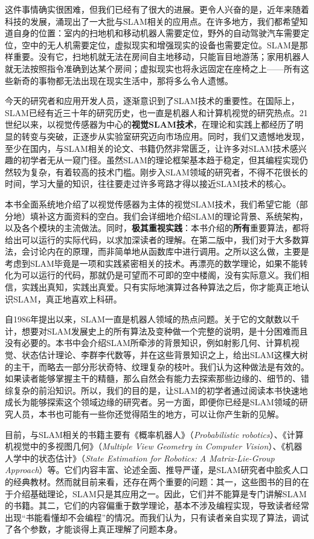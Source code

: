 这件事情确实很困难，但我们已经有了很大的进展。更令人兴奋的是，近年来随着科技的发展，涌现出了一大批与SLAM相关的应用点。在许多地方，我们都希望知道自身的位置：室内的扫地机和移动机器人需要定位，野外的自动驾驶汽车需要定位，空中的无人机需要定位，虚拟现实和增强现实的设备也需要定位。SLAM是那样重要。没有它，扫地机就无法在房间自主地移动，只能盲目地游荡；家用机器人就无法按照指令准确到达某个房间；虚拟现实也将永远固定在座椅之上——所有这些新奇的事物都无法出现在现实生活中，那将多么令人遗憾。

今天的研究者和应用开发人员，逐渐意识到了SLAM技术的重要性。在国际上，SLAM已经有近三十年的研究历史，也一直是机器人和计算机视觉的研究热点。21世纪以来，以视觉传感器为中心的\textbf{视觉SLAM技术}，在理论和实践上都经历了明显的转变与突破，正逐步从实验室研究迈向市场应用。同时，我们又遗憾地发现，至少在国内，与SLAM相关的论文、书籍仍然非常匮乏，让许多对SLAM技术感兴趣的初学者无从一窥门径。虽然SLAM的理论框架基本趋于稳定，但其编程实现仍然较为复杂，有着较高的技术门槛。刚步入SLAM领域的研究者，不得不花很长的时间，学习大量的知识，往往要走过许多弯路才得以接近SLAM技术的核心。

本书全面系统地介绍了以视觉传感器为主体的视觉SLAM技术，我们希望它能（部分地）填补这方面资料的空白。我们会详细地介绍SLAM的理论背景、系统架构，以及各个模块的主流做法。同时，\textbf{极其重视实践}：本书介绍的\textbf{所有}重要算法，都将给出可以运行的实际代码，以求加深读者的理解。在第二版中，我们对于大多数算法，会讨论内在的原理，而非简单地从函数库中进行调用。之所以这么做，主要是考虑到SLAM毕竟是一项和实践紧密相关的技术。再漂亮的数学理论，如果不能转化为可以运行的代码，那就仍是可望而不可即的空中楼阁，没有实际意义。我们相信，实践出真知，实践出真爱。只有实际地演算过各种算法之后，你才能真正地认识SLAM，真正地喜欢上科研。

自1986年提出以来\textsuperscript{\cite{Smith1986}}，SLAM一直是机器人领域的热点问题。关于它的文献数以千计，想要对SLAM发展史上的所有算法及变种做一个完整的说明，是十分困难而且没有必要的。本书中会介绍SLAM所牵涉的背景知识，例如射影几何、计算机视觉、状态估计理论、李群李代数等，并在这些背景知识之上，给出SLAM这棵大树的主干，而略去一部分形状奇特、纹理复杂的枝叶。我们认为这种做法是有效的。如果读者能够掌握主干的精髓，那么自然会有能力去探索那些边缘的、细节的、错综复杂的前沿知识。所以，我们的目的是，让SLAM的初学者通过阅读本书快速地成长为能够探索这个领域边缘的研究者。另一方面，即便你已经是SLAM领域的研究人员，本书也可能有一些你还觉得陌生的地方，可以让你产生新的见解。

目前，与SLAM相关的书籍主要有《概率机器人》（\textit{Probabilistic robotics}）\textsuperscript{\cite{Thrun2005}}、《计算机视觉中的多视图几何》（\textit{Multiple View Geometry in Computer Vision}）\textsuperscript{\cite{Hartley2003}}、《机器人学中的状态估计》（\textit{State Estimation for Robotics: A Matrix-Lie-Group Approach}）\textsuperscript{\cite{Barfoot2016}}等。它们内容丰富、论述全面、推导严谨，是SLAM研究者中脍炙人口的经典教材。然而就目前来看，还存在两个重要的问题：其一，这些图书的目的在于介绍基础理论，SLAM只是其应用之一。因此，它们并不能算是专门讲解SLAM的书籍。其二，它们的内容偏重于数学理论，基本不涉及编程实现，导致读者经常出现“书能看懂却不会编程”的情况。而我们认为，只有读者亲自实现了算法，调试了各个参数，才能谈得上真正理解了问题本身。

